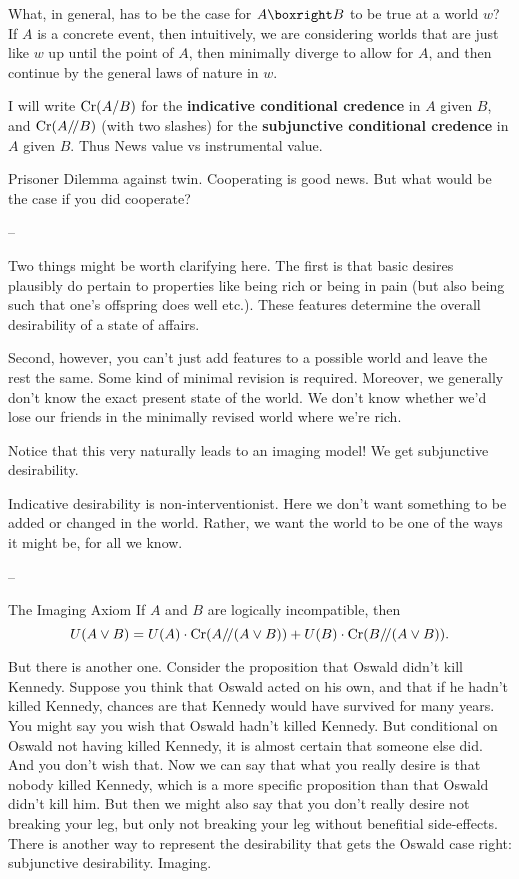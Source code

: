 {What, in general, has to be the case for $A \boxright B$ to be true at
a world $w$?  If $A$ is a concrete event, then intuitively, we are
considering worlds that are just like $w$ up until the point of $A$,
then minimally diverge to allow for $A$, and then continue by the
general laws of nature in $w$.




I will write $\text{Cr}(A/B)$ for the \textbf{indicative conditional
  credence} in $A$ given $B$, and $\text{Cr}(A/\!/B)$ (with two slashes) for
the \textbf{subjunctive conditional credence} in $A$ given $B$. Thus
News value vs instrumental value. 

Prisoner Dilemma against twin. Cooperating is good news. But what
would be the case if you did cooperate?

--

Two things might be worth clarifying here. The first is that basic
desires plausibly do pertain to properties like being rich or being in
pain (but also being such that one's offspring does well etc.). These
features determine the overall desirability of a state of affairs.

Second, however, you can't just add features to a possible world and
leave the rest the same. Some kind of minimal revision is
required. Moreover, we generally don't know the exact present state of
the world. We don't know whether we'd lose our friends in the
minimally revised world where we're rich.

Notice that this very naturally leads to an imaging model! We get
subjunctive desirability. 

Indicative desirability is non-interventionist. Here we don't want
something to be added or changed in the world. Rather, we want the
world to be one of the ways it might be, for all we know.

--

\begin{genericthm}{The Imaging Axiom}
  If $A$ and $B$ are logically incompatible, then 
  \[ U(A \lor B) =
  U(A)\cdot \text{Cr}(A/\!/(A\lor B)) + U(B)\cdot \text{Cr}(B/\!/(A \lor B)). \]
\end{genericthm}

But there is another one. Consider the proposition that Oswald didn't
kill Kennedy. Suppose you think that Oswald acted on his own, and that
if he hadn't killed Kennedy, chances are that Kennedy would have
survived for many years. You might say you wish that Oswald hadn't
killed Kennedy. But conditional on Oswald not having killed Kennedy,
it is almost certain that someone else did. And you don't wish
that. Now we can say that what you really desire is that nobody killed
Kennedy, which is a more specific proposition than that Oswald didn't
kill him. But then we might also say that you don't really desire not
breaking your leg, but only not breaking your leg without benefitial
side-effects. There is another way to represent the desirability that
gets the Oswald case right: subjunctive desirability. Imaging.


}
